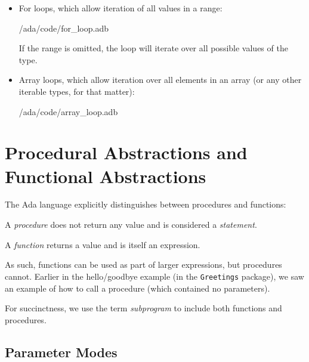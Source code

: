\begin{description}
\begin{itemize}
 {\rootdir/ada/code/until_loop.adb}

        \item For loops, which allow iteration of all values in a range:

 {\rootdir/ada/code/for_loop.adb}

     If the range is omitted, the loop will iterate over all possible values of the type.

       \item Array loops, which allow iteration over all elements in an array (or any other iterable types, for that matter):

 {\rootdir/ada/code/array_loop.adb}



      \end{itemize}
  \end{description}




\section{Procedural Abstractions and Functional Abstractions}

The Ada language explicitly distinguishes between procedures and functions:
  
\begin{definition}
 A \emph{procedure} does not return any
  value and is considered a {\em statement}.
\end{definition}

\begin{definition}
A \emph{function} returns a value and is itself an expression.
\end{definition}

As such, functions can be used as part of larger expressions, but procedures cannot. Earlier in the hello/goodbye example (in the \texttt{Greetings} package), we saw an example of how to call a procedure (which contained no parameters). 

For succinctness, we use the term \emph{subprogram} to include both functions and procedures.

\subsection{Parameter Modes}


